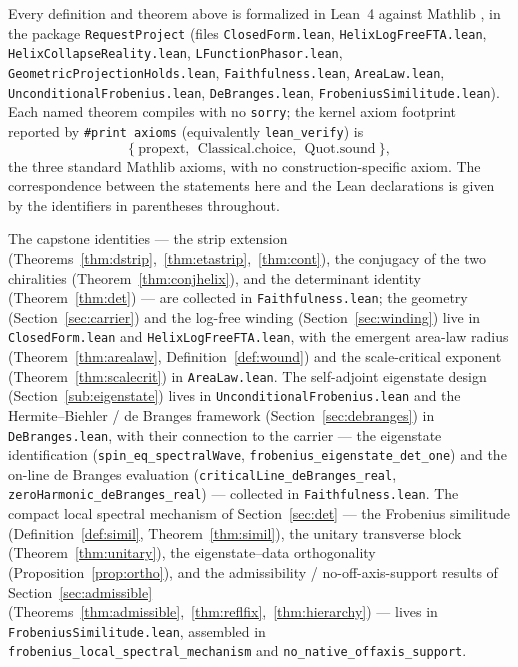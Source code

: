 \documentclass[11pt]{article}
\newcommand{\code}[1]{\texttt{#1}}
\begin{document}
Every definition and theorem above is formalized in Lean~4 \cite{Lean4} against Mathlib
\cite{Mathlib2020}, in the package
\code{RequestProject} (files \code{ClosedForm.lean}, \code{HelixLogFreeFTA.lean},
\code{HelixCollapseReality.lean}, \code{LFunctionPhasor.lean}, \code{GeometricProjectionHolds.lean},
\code{Faithfulness.lean}, \code{AreaLaw.lean}, \code{UnconditionalFrobenius.lean},
\code{DeBranges.lean}, \code{FrobeniusSimilitude.lean}). Each named
theorem compiles with no \code{sorry}; the kernel axiom footprint reported by \code{\#print axioms}
(equivalently \code{lean\_verify}) is
\[
  \{\ \mathrm{propext},\ \ \mathrm{Classical.choice},\ \ \mathrm{Quot.sound}\ \},
\]
the three standard Mathlib axioms, with no construction-specific axiom. The correspondence between
the statements here and the Lean declarations is given by the identifiers in parentheses throughout.

The capstone identities --- the strip extension (Theorems~\ref{thm:dstrip},~\ref{thm:etastrip},~\ref{thm:cont}),
the conjugacy of the two chiralities (Theorem~\ref{thm:conjhelix}), and the determinant identity
(Theorem~\ref{thm:det}) --- are collected in \code{Faithfulness.lean}; the geometry
(Section~\ref{sec:carrier}) and the log-free winding (Section~\ref{sec:winding}) live in
\code{ClosedForm.lean} and \code{HelixLogFreeFTA.lean}, with the emergent area-law radius
(Theorem~\ref{thm:arealaw}, Definition~\ref{def:wound}) and the scale-critical exponent
(Theorem~\ref{thm:scalecrit}) in \code{AreaLaw.lean}. The self-adjoint eigenstate design
(Section~\ref{sub:eigenstate}) lives in \code{UnconditionalFrobenius.lean} and the Hermite--Biehler /
de Branges framework (Section~\ref{sec:debranges}) in \code{DeBranges.lean}, with their connection to
the carrier --- the eigenstate identification (\code{spin\_eq\_spectralWave},
\code{frobenius\_eigenstate\_det\_one}) and the on-line de Branges evaluation
(\code{criticalLine\_deBranges\_real}, \code{zeroHarmonic\_deBranges\_real}) --- collected in
\code{Faithfulness.lean}. The compact local spectral mechanism of Section~\ref{sec:det} --- the
Frobenius similitude (Definition~\ref{def:simil}, Theorem~\ref{thm:simil}), the unitary transverse
block (Theorem~\ref{thm:unitary}), the eigenstate--data orthogonality
(Proposition~\ref{prop:ortho}), and the admissibility / no-off-axis-support results of
Section~\ref{sec:admissible} (Theorems~\ref{thm:admissible},~\ref{thm:reflfix},~\ref{thm:hierarchy})
--- lives in \code{FrobeniusSimilitude.lean}, assembled in
\code{frobenius\_local\_spectral\_mechanism} and \code{no\_native\_offaxis\_support}.
\end{document}
